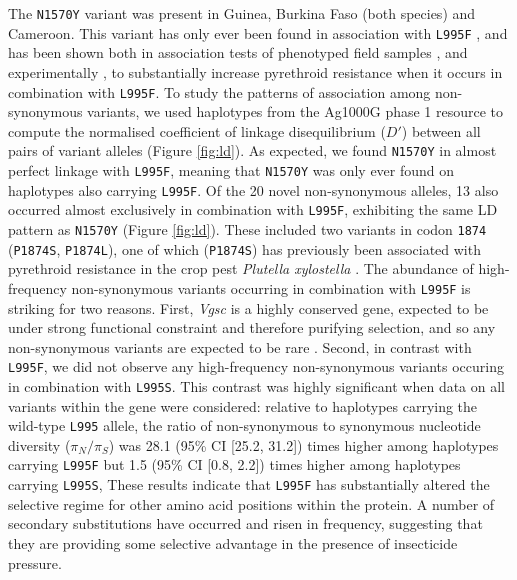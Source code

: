 \documentclass[a4paper,11pt,abstracton,hidelinks]{scrartcl}
\begin{document}
%
The \texttt{N1570Y} variant was present in Guinea, Burkina Faso (both species) and Cameroon.
%
This variant has only ever been found in association with \texttt{L995F} \cite{Jones2012}, and has been shown both in association tests of phenotyped field samples \cite{Jones2012}, and experimentally \cite{Wang2015}, to substantially increase pyrethroid resistance when it occurs in combination with \texttt{L995F}.
%
To study the patterns of association among non-synonymous variants, we used haplotypes from the Ag1000G phase 1 resource to compute the normalised coefficient  of linkage disequilibrium ($D'$) between all pairs of variant alleles (Figure \ref{fig:ld}).
%
As expected, we found \texttt{N1570Y} in almost perfect linkage with \texttt{L995F}, meaning that \texttt{N1570Y} was only ever found on haplotypes also carrying \texttt{L995F}.
%
Of the 20 novel non-synonymous alleles, 13 also occurred almost exclusively in combination with \texttt{L995F}, exhibiting the same LD pattern as \texttt{N1570Y} (Figure \ref{fig:ld}).
%
These included two variants in codon \texttt{1874} (\texttt{P1874S}, \texttt{P1874L}), one of which (\texttt{P1874S}) has previously been associated with pyrethroid resistance in the crop pest \textit{Plutella xylostella} \cite{Sonoda2008}.
%
The abundance of high-frequency non-synonymous variants occurring in combination with \texttt{L995F} is striking for two reasons.
%
First, \textit{Vgsc} is a highly conserved gene, expected to be under strong functional constraint and therefore purifying selection, and so any non-synonymous variants are expected to be rare \cite{Davies2007b}.
%
Second, in contrast with \texttt{L995F}, we did not observe any high-frequency non-synonymous variants occuring in combination with \texttt{L995S}.
%
This contrast was highly significant when data on all variants within the gene were considered: relative to haplotypes carrying the wild-type \texttt{L995} allele, the ratio of non-synonymous to synonymous nucleotide diversity ($\pi_{N}/\pi_{S}$) was 28.1 (95\% CI [25.2, 31.2]) times higher among haplotypes carrying \texttt{L995F} but 1.5 (95\% CI [0.8, 2.2]) times higher among haplotypes carrying \texttt{L995S},
%
These results indicate that \texttt{L995F} has substantially altered the selective regime for other amino acid positions within the protein.
%
A number of secondary substitutions have occurred and risen in frequency, suggesting that they are providing some selective advantage in the presence of insecticide pressure.
\end{document}
